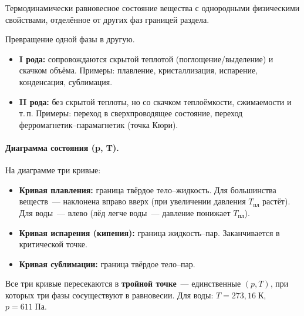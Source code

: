 \documentclass[12pt]{article}
\begin{document}
\begin{definition}[Фаза]
	Термодинамически равновесное состояние вещества с однородными физическими свойствами, отделённое от других фаз границей раздела.
\end{definition}

\begin{definition}
	Превращение одной фазы в другую.
	\begin{itemize}
		\item \textbf{I рода:} сопровождаются скрытой теплотой (поглощение/выделение) и скачком объёма. Примеры: плавление, кристаллизация, испарение, конденсация, сублимация.
		\item \textbf{II рода:} без скрытой теплоты, но со скачком теплоёмкости, сжимаемости и т.\,п. Примеры: переход в сверхпроводящее состояние, переход ферромагнетик--парамагнетик (точка Кюри).
	\end{itemize}
\end{definition}

\paragraph{Диаграмма состояния (p, T).}

На диаграмме три кривые:
\begin{itemize}
	\item \textbf{Кривая плавления:} граница твёрдое тело--жидкость. Для большинства веществ~--- наклонена вправо вверх (при увеличении давления $T_{\text{пл}}$ растёт). Для воды~--- влево (лёд легче воды~--- давление понижает $T_{\text{пл}}$).
	\item \textbf{Кривая испарения (кипения):} граница жидкость--пар. Заканчивается в критической точке.
	\item \textbf{Кривая сублимации:} граница твёрдое тело--пар.
\end{itemize}

Все три кривые пересекаются в \textbf{тройной точке}~--- единственные $(p, T)$, при которых три фазы сосуществуют в равновесии. Для воды: $T = 273{,}16 \; \text{К}$, $p = 611 \; \text{Па}$.
\end{document}
